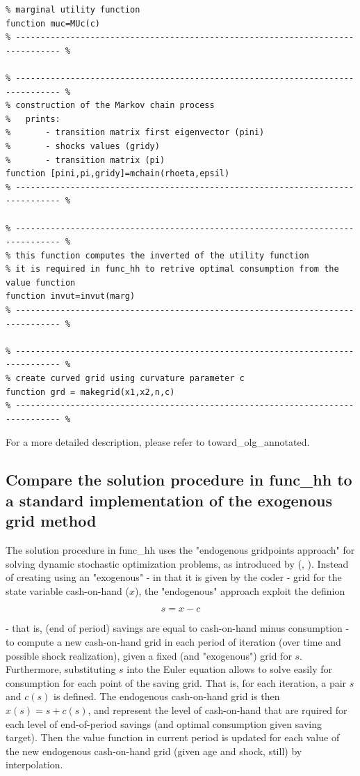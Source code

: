 \documentclass[12pt,a4paper]{article}
\begin{document}
\pagebreak
\begin{lstlisting}[frame=single]
% ------------------------------------------------------------------------------- %
% marginal utility function
function muc=MUc(c)
% ------------------------------------------------------------------------------- %

% ------------------------------------------------------------------------------- %
% construction of the Markov chain process
%   prints:
%       - transition matrix first eigenvector (pini)
%       - shocks values (gridy)
%       - transition matrix (pi)
function [pini,pi,gridy]=mchain(rhoeta,epsil)
% ------------------------------------------------------------------------------- %

% ------------------------------------------------------------------------------- %
% this function computes the inverted of the utility function
% it is required in func_hh to retrive optimal consumption from the value function
function invut=invut(marg)
% ------------------------------------------------------------------------------- %

% ------------------------------------------------------------------------------- %
% create curved grid using curvature parameter c
function grd = makegrid(x1,x2,n,c)
% ------------------------------------------------------------------------------- %
\end{lstlisting}

For a more detailed description, please refer to {\selectfont toward\_olg\_annotated}.

\subsection*{Compare the solution procedure in {\selectfont func\_hh} to a standard implementation of the exogenous grid method}

The solution procedure in {\selectfont func\_hh} uses the "endogenous gridpoints approach" for solving dynamic stochastic optimization problems, as introduced by \citeauthor{carroll2002lecture} (\citeyear{carroll2002lecture}, \citeyear{carroll2006method}). Instead of creating using an "exogenous" - in that it is given by the coder - grid for the state variable cash-on-hand ($x$), the "endogenous" approach exploit the definion

$$ s = x - c $$

- that is, (end of period) savings are equal to cash-on-hand minus consumption - to compute a new cash-on-hand grid in each period of iteration (over time and possible shock realization), given a fixed (and "exogenous") grid for $s$. Furthermore, substituting $s$ into the Euler equation allows to solve easily for consumption for each point of the saving grid. That is, for each iteration, a pair $s$ and $c(s)$ is defined. The endogenous cash-on-hand grid is then $x(s) = s + c(s)$, and represent the level of cash-on-hand that are rquired for each level of end-of-period savings (and optimal consumption given saving target). Then the value function in current period is updated for each value of the new endogenous cash-on-hand grid (given age and shock, still) by interpolation.
\end{document}
